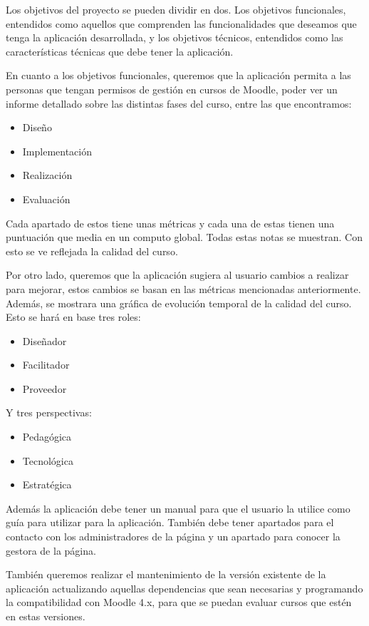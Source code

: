 
Los objetivos del proyecto se pueden dividir en dos. Los objetivos funcionales, entendidos como aquellos que comprenden las funcionalidades que deseamos que tenga la aplicación desarrollada, y los objetivos técnicos, entendidos como las características técnicas que debe tener la aplicación.

En cuanto a los objetivos funcionales, queremos que la aplicación permita a las personas que tengan permisos de gestión en cursos de Moodle, poder ver un informe detallado sobre las distintas fases del curso, entre las que encontramos: 
\begin{itemize}
    \item Diseño
    \item Implementación
    \item Realización
    \item Evaluación
\end{itemize}

Cada apartado de estos tiene unas métricas y cada una de estas tienen una puntuación que media en un computo global. Todas estas notas se muestran. Con esto se ve reflejada la calidad del curso.

Por otro lado, queremos que la aplicación sugiera al usuario cambios a realizar para mejorar, estos cambios se basan en las métricas mencionadas anteriormente. Además, se mostrara una gráfica de evolución temporal de la calidad del curso. Esto se hará en base tres roles:
\begin{itemize}
    \item Diseñador
    \item Facilitador
    \item Proveedor
\end{itemize}
Y tres perspectivas:
\begin{itemize}
    \item Pedagógica
    \item Tecnológica
    \item Estratégica
\end{itemize}

Además la aplicación debe tener un manual para que el usuario la utilice como guía para utilizar para la aplicación. También debe tener apartados para el contacto con los administradores de la página y un apartado para conocer la 
gestora de la página.

También queremos realizar el mantenimiento de la versión existente\cite{tfg-robertoArasti} de la aplicación actualizando aquellas dependencias que sean necesarias y programando la compatibilidad con Moodle 4.x, para que se puedan evaluar cursos que estén en estas versiones. 

